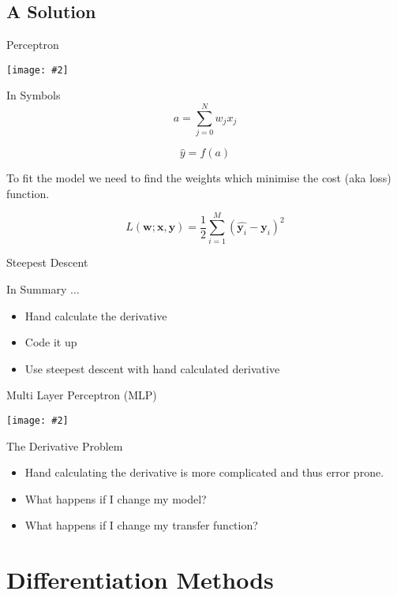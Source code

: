 \documentclass{beamer}
\newcommand {\framedgraphic}[2] {
    \begin{frame}{#1}
        \begin{center}
            \texttt{[image: \#2]}
        \end{center}
    \end{frame}
}
\begin{document}
\subsection{A Solution}

\framedgraphic{Perceptron}{diagrams/Fita1.png}

\begin{frame}[fragile]{In Symbols}
$$
a = \sum_{j=0}^{N} w_{j} x_j
$$

$$
\hat{y} = f(a)
$$

To fit the model we need to find the weights which minimise the cost
(aka loss) function.

$$
L(\boldsymbol{w}; \boldsymbol{x}, \boldsymbol{y}) =
\frac{1}{2}\sum_{i=1}^M(\hat{\boldsymbol{y}_i} - \boldsymbol{y}_i)^2
$$
\end{frame}

\begin{frame}[fragile]{Steepest Descent}
\end{frame}

\begin{frame}[fragile]{In Summary $\ldots$}
\begin{itemize}
\item Hand calculate the derivative
\item Code it up
\item Use steepest descent with hand calculated derivative
\end{itemize}
\end{frame}

\framedgraphic{Multi Layer Perceptron (MLP)}{diagrams/Fita2.png}

\begin{frame}[fragile]{The Derivative Problem}
\begin{itemize}
\item Hand calculating the derivative is more complicated and thus error prone.
\item What happens if I change my model?
\item What happens if I change my transfer function?
\end{itemize}
\end{frame}

\section{Differentiation Methods}
\end{document}
